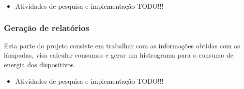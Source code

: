 \documentclass[11pt]{article}
\begin{document}
\begin{itemize}
\item Atividades de pesquisa e implementação
TODO!!!
\end{itemize}

\subsubsection{Geração de relatórios}
\label{sec:org91d86b4}
Esta parte do projeto consiste em trabalhar com as informações obtidas com as lâmpadas, visa calcular consumos e gerar um histrograma para o consumo de energia dos dispositivos.

\begin{itemize}
\item Atividades de pesquisa e implementação
TODO!!!
\end{itemize}
\end{document}
